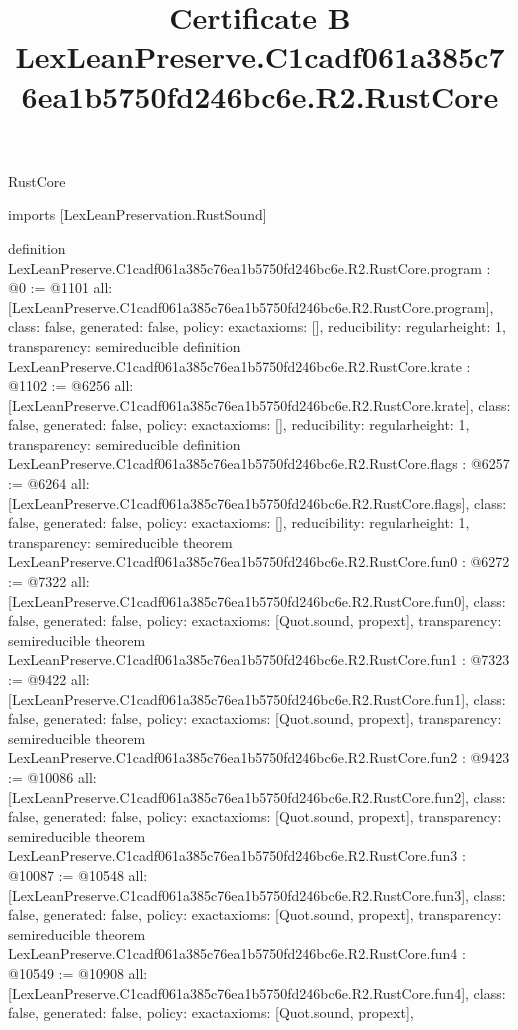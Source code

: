 \begin{lexlean}{RustCore}
\title{Certificate B LexLeanPreserve.C1cadf061a385c76ea1b5750fd246bc6e.R2.RustCore}
\begin{coremodule}
imports [LexLeanPreservation.RustSound]

definition LexLeanPreserve.C1cadf061a385c76ea1b5750fd246bc6e.R2.RustCore.program : @0 := @1101 {
  all: [LexLeanPreserve.C1cadf061a385c76ea1b5750fd246bc6e.R2.RustCore.program],
  class: false,
  generated: false,
  policy: exact{axioms: []},
  reducibility: regular{height: 1},
  transparency: semireducible
}
definition LexLeanPreserve.C1cadf061a385c76ea1b5750fd246bc6e.R2.RustCore.krate : @1102 := @6256 {
  all: [LexLeanPreserve.C1cadf061a385c76ea1b5750fd246bc6e.R2.RustCore.krate],
  class: false,
  generated: false,
  policy: exact{axioms: []},
  reducibility: regular{height: 1},
  transparency: semireducible
}
definition LexLeanPreserve.C1cadf061a385c76ea1b5750fd246bc6e.R2.RustCore.flags : @6257 := @6264 {
  all: [LexLeanPreserve.C1cadf061a385c76ea1b5750fd246bc6e.R2.RustCore.flags],
  class: false,
  generated: false,
  policy: exact{axioms: []},
  reducibility: regular{height: 1},
  transparency: semireducible
}
theorem LexLeanPreserve.C1cadf061a385c76ea1b5750fd246bc6e.R2.RustCore.fun0 : @6272 := @7322 {
  all: [LexLeanPreserve.C1cadf061a385c76ea1b5750fd246bc6e.R2.RustCore.fun0],
  class: false,
  generated: false,
  policy: exact{axioms: [Quot.sound, propext]},
  transparency: semireducible
}
theorem LexLeanPreserve.C1cadf061a385c76ea1b5750fd246bc6e.R2.RustCore.fun1 : @7323 := @9422 {
  all: [LexLeanPreserve.C1cadf061a385c76ea1b5750fd246bc6e.R2.RustCore.fun1],
  class: false,
  generated: false,
  policy: exact{axioms: [Quot.sound, propext]},
  transparency: semireducible
}
theorem LexLeanPreserve.C1cadf061a385c76ea1b5750fd246bc6e.R2.RustCore.fun2 : @9423 := @10086 {
  all: [LexLeanPreserve.C1cadf061a385c76ea1b5750fd246bc6e.R2.RustCore.fun2],
  class: false,
  generated: false,
  policy: exact{axioms: [Quot.sound, propext]},
  transparency: semireducible
}
theorem LexLeanPreserve.C1cadf061a385c76ea1b5750fd246bc6e.R2.RustCore.fun3 : @10087 := @10548 {
  all: [LexLeanPreserve.C1cadf061a385c76ea1b5750fd246bc6e.R2.RustCore.fun3],
  class: false,
  generated: false,
  policy: exact{axioms: [Quot.sound, propext]},
  transparency: semireducible
}
theorem LexLeanPreserve.C1cadf061a385c76ea1b5750fd246bc6e.R2.RustCore.fun4 : @10549 := @10908 {
  all: [LexLeanPreserve.C1cadf061a385c76ea1b5750fd246bc6e.R2.RustCore.fun4],
  class: false,
  generated: false,
  policy: exact{axioms: [Quot.sound, propext]},
}
\end{coremodule}
\end{lexlean}
